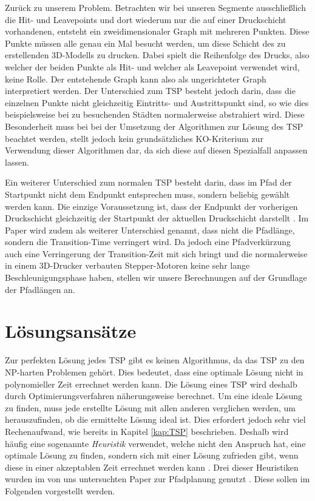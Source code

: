 \documentclass[12pt, a4paper]{article}
\begin{document}
Zurück zu unserem Problem. Betrachten wir bei unseren Segmente ausschließlich die Hit- und Leavepoints und dort wiederum nur die auf einer Druckschicht vorhandenen, entsteht ein zweidimensionaler Graph mit mehreren Punkten. Diese Punkte müssen alle genau ein Mal besucht werden, um diese Schicht des zu erstellenden 3D-Modells zu drucken. Dabei spielt die Reihenfolge des Drucks, also welcher der beiden Punkte als Hit- und welcher als Leavepoint verwendet wird, keine Rolle. Der entstehende Graph kann also als ungerichteter Graph interpretiert werden. Der Unterschied zum TSP besteht jedoch darin, dass die einzelnen Punkte nicht gleichzeitig Eintritts- und Austrittspunkt sind, so wie dies beispielsweise bei zu besuchenden Städten normalerweise abstrahiert wird. Diese Besonderheit muss bei bei der Umsetzung der Algorithmen zur Lösung des TSP beachtet werden, stellt jedoch kein grundsätzliches KO-Kriterium zur Verwendung dieser Algorithmen dar, da sich diese auf diesen Spezialfall anpassen lassen.

Ein weiterer Unterschied zum normalen TSP besteht darin, dass im Pfad der Startpunkt nicht dem Endpunkt entsprechen muss, sondern beliebig gewählt werden kann. Die einzige Voraussetzung ist, dass der Endpunkt der vorherigen Druckschicht gleichzeitig der Startpunkt der aktuellen Druckschicht darstellt \cite[vgl. Kapitel III]{Paper.2016}.
Im Paper wird zudem als weiterer Unterschied genannt, dass nicht die Pfadlänge, sondern die Transition-Time verringert wird. Da jedoch eine Pfadverkürzung auch eine Verringerung der Transition-Zeit mit sich bringt und die normalerweise in einem 3D-Drucker verbauten Stepper-Motoren keine sehr lange Beschleunigungsphase haben, stellen wir unsere Berechnungen auf der Grundlage der Pfadlängen an.

\section{Lösungsansätze \label{kap:Lösungsansätze}}
Zur perfekten Lösung jedes TSP gibt es keinen Algorithmus, da das TSP zu den NP-harten Problemen gehört. Dies bedeutet, dass eine optimale Lösung nicht in polynomieller Zeit errechnet werden kann. Die Lösung eines TSP wird deshalb durch Optimierungsverfahren näherungsweise berechnet. Um eine ideale Lösung zu finden, muss jede erstellte Lösung mit allen anderen verglichen werden, um herauszufinden, ob die ermittelte Lösung ideal ist. Dies erfordert jedoch sehr viel Rechenaufwand, wie bereits in Kapitel \ref{kap:TSP} beschrieben. Deshalb wird häufig eine sogenannte \textit{Heuristik} verwendet, welche nicht den Anspruch hat, eine optimale Lösung zu finden, sondern sich mit einer Lösung zufrieden gibt, wenn diese in einer akzeptablen Zeit errechnet werden kann \cite[S. 113]{Groetschel.2005}. Drei dieser Heuristiken wurden im von uns untersuchten Paper zur Pfadplanung genutzt \cite[vgl. Kapitel III]{Paper.2016}. Diese sollen im Folgenden vorgestellt werden.
\end{document}
